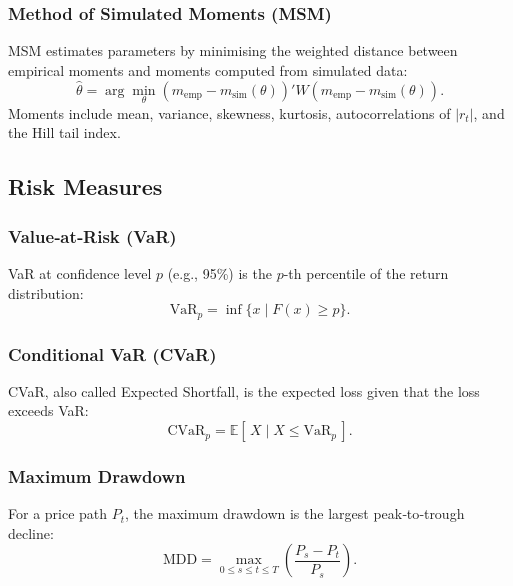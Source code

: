 \subsubsection{Method of Simulated Moments (MSM)}
MSM estimates parameters by minimising the weighted distance between empirical moments and moments computed from simulated data:
\[
\hat{\theta} = \arg\min_{\theta} \left( m_{\text{emp}} - m_{\text{sim}}(\theta) \right)' W \left( m_{\text{emp}} - m_{\text{sim}}(\theta) \right).
\]
Moments include mean, variance, skewness, kurtosis, autocorrelations of \(|r_t|\), and the Hill tail index.

\subsection{Risk Measures}

\subsubsection{Value‑at‑Risk (VaR)}
VaR at confidence level \(p\) (e.g., 95\%) is the \(p\)-th percentile of the return distribution:
\[
\text{VaR}_p = \inf\{ x \mid F(x) \ge p \}.
\]

\subsubsection{Conditional VaR (CVaR)}
CVaR, also called Expected Shortfall, is the expected loss given that the loss exceeds VaR:
\[
\text{CVaR}_p = \mathbb{E}[\,X \mid X \le \text{VaR}_p\,].
\]

\subsubsection{Maximum Drawdown}
For a price path \(P_t\), the maximum drawdown is the largest peak‑to‑trough decline:
\[
\text{MDD} = \max_{0 \le s \le t \le T} \left( \frac{P_s - P_t}{P_s} \right).
\]